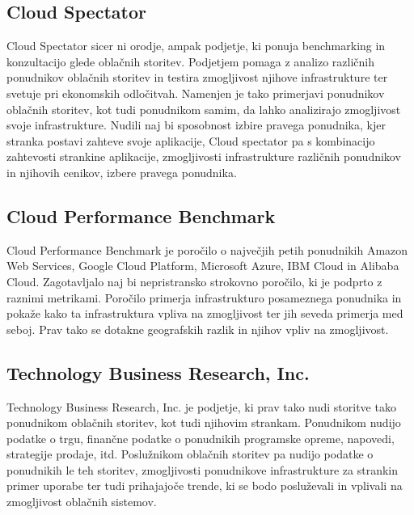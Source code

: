 \subsection{Cloud Spectator}

Cloud Spectator sicer ni orodje, ampak podjetje, ki ponuja benchmarking in konzultacijo glede oblačnih storitev. Podjetjem pomaga z analizo različnih ponudnikov oblačnih storitev in testira zmogljivost njihove infrastrukture ter svetuje pri ekonomskih odločitvah. Namenjen je tako primerjavi ponudnikov oblačnih storitev, kot tudi ponudnikom samim, da lahko analizirajo zmogljivost svoje infrastrukture. Nudili naj bi sposobnost izbire pravega ponudnika, kjer stranka postavi zahteve svoje aplikacije, Cloud spectator pa s kombinacijo zahtevosti strankine aplikacije, zmogljivosti infrastrukture različnih ponudnikov in njihovih cenikov, izbere pravega ponudnika.


\subsection{Cloud Performance Benchmark}

Cloud Performance Benchmark je poročilo o največjih petih ponudnikih Amazon Web Services, Google Cloud Platform, Microsoft Azure, IBM Cloud in Alibaba Cloud. Zagotavljalo naj bi nepristransko strokovno poročilo, ki je podprto z raznimi metrikami. Poročilo primerja infrastrukturo posameznega ponudnika in pokaže kako ta infrastruktura vpliva na zmogljivost ter jih seveda primerja med seboj. Prav tako se dotakne geografskih razlik in njihov vpliv na zmogljivost.

\subsection{Technology Business Research, Inc.}

Technology Business Research, Inc. je podjetje, ki prav tako nudi storitve tako ponudnikom oblačnih storitev, kot tudi njihovim strankam. Ponudnikom nudijo podatke o trgu, finančne podatke o ponudnikih programske opreme, napovedi, strategije prodaje, itd. Poslužnikom oblačnih storitev pa nudijo podatke o ponudnikih le teh storitev, zmogljivosti ponudnikove infrastrukture za strankin primer uporabe ter tudi prihajajoče trende, ki se bodo posluževali in vplivali na zmogljivost oblačnih sistemov.



